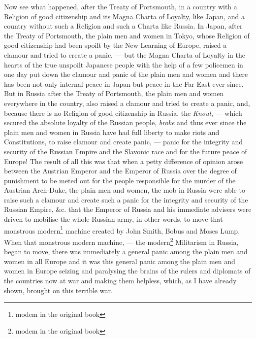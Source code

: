 Now see what happened, after the Treaty of Portsmouth, in a country with a Religion of good citizenship and its Magna Charta of Loyalty, like Japan, and a country without such a Religion and such a Charta like Russia.
In Japan, after the Treaty of Portsmouth, the plain men and women in Tokyo, whose Religion of good citizenship had been spoilt by the New Learning of Europe, raised a clamour and tried to create a panic, --- but the Magna Charta of Loyalty in the hearts of the true unspoilt Japanese people with the help of a few policemen in one day put down the clamour and panic of the plain men and women and there has been not only internal peace in Japan but peace in the Far East ever since\cite{num28}. 
But in Russia after the Treaty of Portsmouth, the plain men and women everywhere in the country, also raised a clamour and tried to create a panic, and, because there is no Religion of good citizenship in Russia, the \emph{Knout}, --- which secured the absolute loyalty of the Russian people, \emph{broke} and thus ever since the plain men and women in Russia have had full liberty to make riots and Constitutions, to raise clamour and create panic, --- panic for the integrity and security of the Russian Empire and the Slavonic race and for the future peace of Europe!
The result of all this was that when a petty difference of opinion arose between the Austrian Emperor and the Emperor of Russia over the degree of punishment to be meted out for the people responsible for the murder of the Austrian Arch-Duke, the plain men and women, the mob in Russia were able to raise such a clamour and create such a panic for the integrity and security of the Russian Empire, $\&$c.  that the Emperor of Russia and his immediate advisers were driven to mobilise the whole Russian army, in other words, to move that monstrous modern\footnote{modem in the original book} machine created by John Smith, Bobus and Moses Lump. 
When that monstrous modern machine, --- the modern\footnote{modem in the original book} Militarism in Russia, began to move, there was immediately a general panic among the plain men and women in all Europe and it was this general panic among the plain men and women in Europe seizing and paralysing the brains of the rulers and diplomats of the countries now at war and making them helpless, which, as I have already shown, brought on this terrible war.

